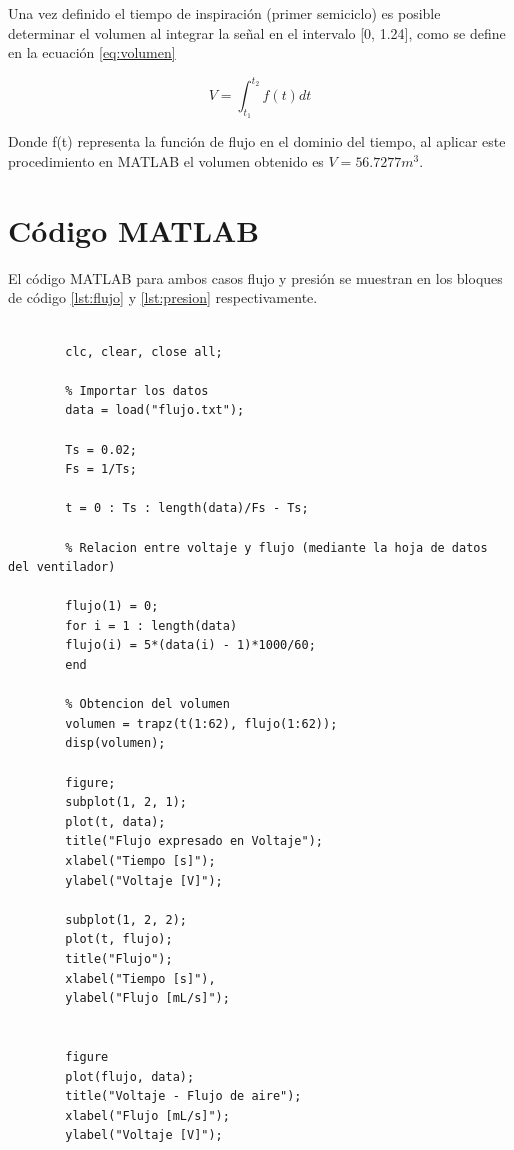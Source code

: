 \documentclass[conference]{IEEEtran}
\begin{document}
	Una vez definido el tiempo de inspiración (primer semiciclo) es posible determinar el volumen al integrar la señal en el intervalo [0, 1.24], como se define en la ecuación \ref{eq:volumen}
	
	\begin{equation}
		V = \int_{t_1}^{t_2}{f(t)dt}
		\label{eq:volumen}
	\end{equation}
	
	Donde f(t) representa la función de flujo en el dominio del tiempo, al aplicar este procedimiento en MATLAB el volumen obtenido es $V = 56.7277 m^3$.
	
	\section{Código MATLAB}
	
	El código MATLAB para ambos casos flujo y presión se muestran en los bloques de código \ref{lst:flujo} y \ref{lst:presion} respectivamente.
	
	\begin{lstlisting}[numbers=none, caption="Análisis de flujo vs Voltaje", label=lst:flujo]
		
		clc, clear, close all;
		
		% Importar los datos
		data = load("flujo.txt");
		
		Ts = 0.02;
		Fs = 1/Ts;
		
		t = 0 : Ts : length(data)/Fs - Ts;
		
		% Relacion entre voltaje y flujo (mediante la hoja de datos del ventilador)
		
		flujo(1) = 0;
		for i = 1 : length(data)
		flujo(i) = 5*(data(i) - 1)*1000/60;
		end
		
		% Obtencion del volumen
		volumen = trapz(t(1:62), flujo(1:62));
		disp(volumen);
		
		figure;
		subplot(1, 2, 1);
		plot(t, data);
		title("Flujo expresado en Voltaje");
		xlabel("Tiempo [s]");
		ylabel("Voltaje [V]");
		
		subplot(1, 2, 2);
		plot(t, flujo);
		title("Flujo");
		xlabel("Tiempo [s]"),
		ylabel("Flujo [mL/s]");
		
		
		figure
		plot(flujo, data);
		title("Voltaje - Flujo de aire");
		xlabel("Flujo [mL/s]");
		ylabel("Voltaje [V]");
		
	\end{lstlisting}	
	
\end{document}
